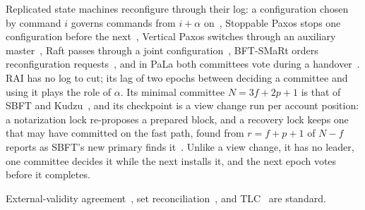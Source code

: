 Replicated state machines reconfigure through their log: a configuration chosen by command $i$ governs commands from $i+\alpha$ on~\cite{lamport2010reconfiguring}, Stoppable Paxos stops one configuration before the next~\cite{lamport2008stoppable}, Vertical Paxos switches through an auxiliary master~\cite{lamport2009vertical}, Raft passes through a joint configuration~\cite{ongaro2014raft}, BFT-SMaRt orders reconfiguration requests~\cite{bessani2014bftsmart}, and in PaLa both committees vote during a handover~\cite{chan2018pala}. RAI has no log to cut; its lag of two epochs between deciding a committee and using it plays the role of $\alpha$. Its minimal committee $N=3f+2p+1$ is that of SBFT and Kudzu~\cite{gueta2019sbft,kudzu}, and its checkpoint is a view change run per account position: a notarization lock re-proposes a prepared block, and a recovery lock keeps one that may have committed on the fast path, found from $r=f+p+1$ of $N-f$ reports as SBFT's new primary finds it~\cite{gueta2019sbft}. Unlike a view change, it has no leader, one committee decides it while the next installs it, and the next epoch votes before it completes.

 External-validity agreement~\cite{externalvalidity,simplex,kudzu}, set reconciliation~\cite{iblt,whatsthedifference,rateless}, and TLC~\cite{tla} are standard.
